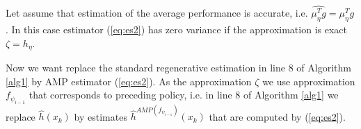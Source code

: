 \documentclass[11pt]{article}
\newcommand{\X}{\mathcal{X}}
\theoremstyle{definition}
\numberwithin{equation}{section}
\begin{document}
Let assume that estimation of the average performance is accurate, i.e. $ \widehat {\mu_\eta^Tg}  = \mu_\eta^Tg$. In this case estimator (\ref{eq:es2}) has zero variance if the approximation is exact $\zeta = h_\eta$.



 

Now we want replace the standard regenerative estimation   in line 8 of Algorithm \ref{alg1} by AMP estimator (\ref{eq:es2}). As the approximation $\zeta$ we use approximation $f_{\psi_{i-1}}$ that corresponds to preceding policy, i.e. in line 8  of Algorithm \ref{alg1} we replace $\hat h (x_k)$ by estimates $\hat h^{AMP(f_{\psi_{i-1}} )} (x_k)$ that are computed by (\ref{eq:es2}).

 
 
\end{document}
